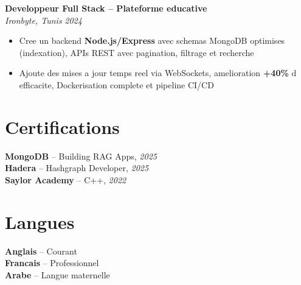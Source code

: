 \documentclass[10pt,a4paper]{article}
\begin{document}
{\vspace{3pt}
\textbf{Developpeur Full Stack -- Plateforme educative}\\[1pt]
\textit{Ironbyte, Tunis} \hfill \textit{2024}
\begin{itemize}
  \item Cree un backend \textbf{Node.js/Express} avec schemas MongoDB optimises (indexation), APIs REST avec pagination, filtrage et recherche
  \item Ajoute des mises a jour temps reel via WebSockets, amelioration \textbf{+40\%} d efficacite, Dockerisation complete et pipeline CI/CD
\end{itemize}

}

\vspace{3pt}
\section*{Certifications}
{\small
\textbf{MongoDB} -- Building RAG Apps, \textit{2025}\\[1pt]
\textbf{Hadera} -- Hashgraph Developer, \textit{2025}\\[1pt]
\textbf{Saylor Academy} -- C++, \textit{2022}
}

\section*{Langues}
{\small
\textbf{Anglais} -- Courant\\[1pt]
\textbf{Francais} -- Professionnel\\[1pt]
\textbf{Arabe} -- Langue maternelle
}
\end{document}
